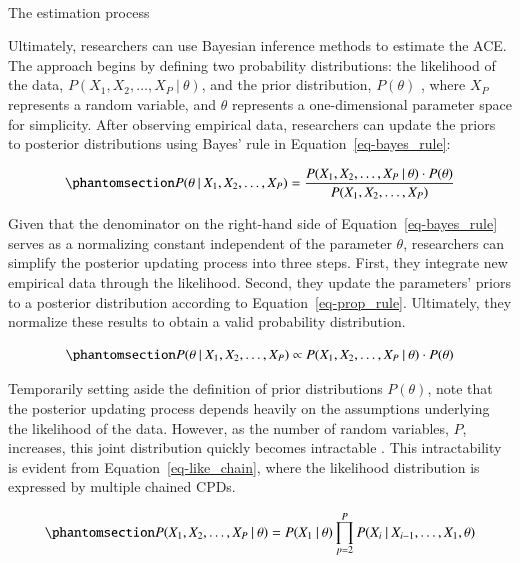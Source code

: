 \documentclass[
  authoryear,
  review,
  1p]{elsarticle}
\makeatletter
\let\oldparagraph\paragraph
\renewcommand{\paragraph}{
    \@ifstar
      \xxxParagraphStar
      \xxxParagraphNoStar
  }
\newcommand{\xxxParagraphStar}[1]{\oldparagraph*{#1}\mbox{}}
\newcommand{\xxxParagraphNoStar}[1]{\oldparagraph{#1}\mbox{}}
\makeatother
\begin{document}
\paragraph{The estimation process}\label{sec-appendixB34}

Ultimately, researchers can use Bayesian inference methods to estimate
the ACE. The approach begins by defining two probability distributions:
the likelihood of the data,
\(P(X_{1}, X_{2}, \dots, X_{P} \:|\:\theta)\), and the prior
distribution, \(P(\theta)\) \citep{Everitt_et_al_2010}, where \(X_{P}\)
represents a random variable, and \(\theta\) represents a
one-dimensional parameter space for simplicity. After observing
empirical data, researchers can update the priors to posterior
distributions using Bayes' rule in Equation~\ref{eq-bayes_rule}:

\begin{equation}\phantomsection\label{eq-bayes_rule}{
P(\theta \:|\:X_{1}, X_{2}, \dots, X_{P}) = \frac{P(X_{1}, X_{2}, \dots, X_{P} \:|\:\theta) \cdot P(\theta)}{P(X_{1}, X_{2}, \dots, X_{P})}
}\end{equation}

Given that the denominator on the right-hand side of
Equation~\ref{eq-bayes_rule} serves as a normalizing constant
independent of the parameter \(\theta\), researchers can simplify the
posterior updating process into three steps. First, they integrate new
empirical data through the likelihood. Second, they update the
parameters' priors to a posterior distribution according to
Equation~\ref{eq-prop_rule}. Ultimately, they normalize these results to
obtain a valid probability distribution.

\begin{equation}\phantomsection\label{eq-prop_rule}{
P(\theta \:|\:X_{1}, X_{2}, \dots, X_{P}) \propto P(X_{1}, X_{2}, \dots, X_{P}\:|\:\theta) \cdot P(\theta)
}\end{equation}

Temporarily setting aside the definition of prior distributions
\(P(\theta)\), note that the posterior updating process depends heavily
on the assumptions underlying the likelihood of the data. However, as
the number of random variables, \(P\), increases, this joint
distribution quickly becomes intractable \citep{Neal_2020}. This
intractability is evident from Equation~\ref{eq-like_chain}, where the
likelihood distribution is expressed by multiple chained CPDs.

\begin{equation}\phantomsection\label{eq-like_chain}{
P(X_{1}, X_{2}, \dots, X_{P} \:|\:\theta) = P(X_{1} \:|\:\theta) \prod^{P}_{p=2} P(X_{i} \:|\:X_{i-1}, \dots, X_{1}, \theta )
}\end{equation}
\end{document}
